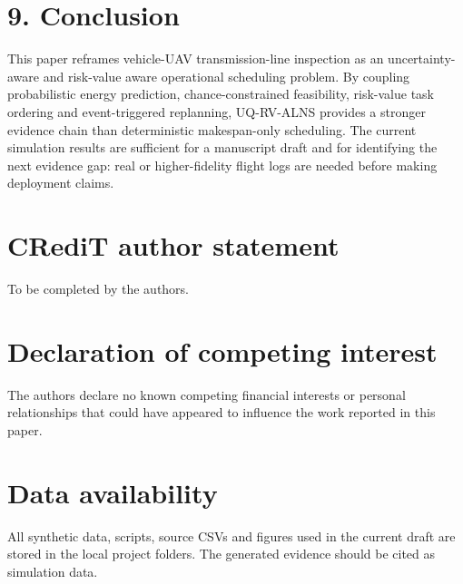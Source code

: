 \documentclass[preprint,12pt]{elsarticle}
\begin{document}
\section{9. Conclusion}

This paper reframes vehicle-UAV transmission-line inspection as an uncertainty-aware and risk-value aware operational scheduling problem. By coupling probabilistic energy prediction, chance-constrained feasibility, risk-value task ordering and event-triggered replanning, UQ-RV-ALNS provides a stronger evidence chain than deterministic makespan-only scheduling. The current simulation results are sufficient for a manuscript draft and for identifying the next evidence gap: real or higher-fidelity flight logs are needed before making deployment claims.

\section{CRediT author statement}

To be completed by the authors.

\section{Declaration of competing interest}

The authors declare no known competing financial interests or personal relationships that could have appeared to influence the work reported in this paper.

\section{Data availability}

All synthetic data, scripts, source CSVs and figures used in the current draft are stored in the local project folders. The generated evidence should be cited as simulation data.



\end{document}
